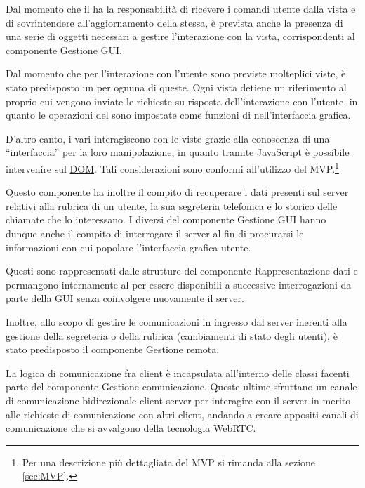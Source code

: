 Dal momento che il  ha la responsabilità di ricevere i comandi utente dalla vista e di sovrintendere all'aggiornamento della stessa, è prevista anche la presenza di una serie di oggetti necessari a gestire l'interazione con la vista, corrispondenti al componente \textsf{Gestione GUI}\@.

Dal momento che per l'interazione con l'utente sono previste molteplici viste, è stato predisposto un  per ognuna di queste. Ogni vista detiene un riferimento al proprio  cui vengono inviate le richieste su risposta dell'interazione con l'utente, in quanto le operazioni del  sono impostate come funzioni di  nell'interfaccia grafica.

D'altro canto, i vari  interagiscono con le viste grazie alla conoscenza di una ``interfaccia'' per la loro manipolazione, in quanto tramite JavaScript è possibile intervenire sul \underline{DOM}\@. Tali considerazioni sono conformi all'utilizzo del  MVP.\footnote{%
  Per una descrizione più dettagliata del  MVP si rimanda alla sezione \ref{sec:MVP}\@.
}

Questo componente ha inoltre il compito di recuperare i dati presenti sul server relativi alla rubrica di un utente, la sua segreteria telefonica e lo storico delle chiamate che lo interessano. I diversi  del componente \textsf{Gestione GUI} hanno dunque anche il compito di interrogare il server al fin di procurarsi le informazioni con cui popolare l'interfaccia grafica utente.

Questi sono rappresentati dalle strutture del componente \textsf{Rappresentazione dati} e permangono internamente al  per essere disponibili a successive interrogazioni da parte della GUI senza coinvolgere nuovamente il server.

Inoltre, allo scopo di gestire le comunicazioni in ingresso dal server inerenti alla gestione della segreteria o della rubrica (cambiamenti di stato degli utenti), è stato predisposto il componente \textsf{Gestione remota}.

La logica di comunicazione fra client è incapsulata all'interno delle classi facenti parte del componente \textsf{Gestione comunicazione}. Queste ultime sfruttano un canale di comunicazione bidirezionale client-server per interagire con il server in merito alle richieste di comunicazione con altri client, andando a creare appositi canali di comunicazione che si avvalgono della tecnologia WebRTC\@.

